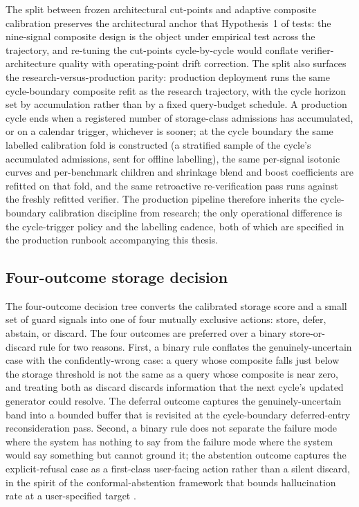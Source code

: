The split between frozen architectural cut-points and adaptive composite calibration preserves the architectural anchor that Hypothesis~1 of  tests: the nine-signal composite design is the object under empirical test across the trajectory, and re-tuning the cut-points cycle-by-cycle would conflate verifier-architecture quality with operating-point drift correction. The split also surfaces the research-versus-production parity: production deployment runs the same cycle-boundary composite refit as the research trajectory, with the cycle horizon set by accumulation rather than by a fixed query-budget schedule. A production cycle ends when a registered number of storage-class admissions has accumulated, or on a calendar trigger, whichever is sooner; at the cycle boundary the same labelled calibration fold is constructed (a stratified sample of the cycle's accumulated admissions, sent for offline labelling), the same per-signal isotonic curves and per-benchmark children and shrinkage blend and boost coefficients are refitted on that fold, and the same retroactive re-verification pass runs against the freshly refitted verifier. The production pipeline therefore inherits the cycle-boundary calibration discipline from research; the only operational difference is the cycle-trigger policy and the labelling cadence, both of which are specified in the production runbook accompanying this thesis.

\subsection{Four-outcome storage decision}
\label{sec:decision}

The four-outcome decision tree converts the calibrated storage score and a small set of guard signals into one of four mutually exclusive actions: store, defer, abstain, or discard. The four outcomes are preferred over a binary store-or-discard rule for two reasons. First, a binary rule conflates the genuinely-uncertain case with the confidently-wrong case: a query whose composite falls just below the storage threshold is not the same as a query whose composite is near zero, and treating both as discard discards information that the next cycle's updated generator could resolve. The deferral outcome captures the genuinely-uncertain band into a bounded buffer that is revisited at the cycle-boundary deferred-entry reconsideration pass. Second, a binary rule does not separate the failure mode where the system has nothing to say from the failure mode where the system would say something but cannot ground it; the abstention outcome captures the explicit-refusal case as a first-class user-facing action rather than a silent discard, in the spirit of the conformal-abstention framework that bounds hallucination rate at a user-specified target \cite{yadkori2024abstention}.

